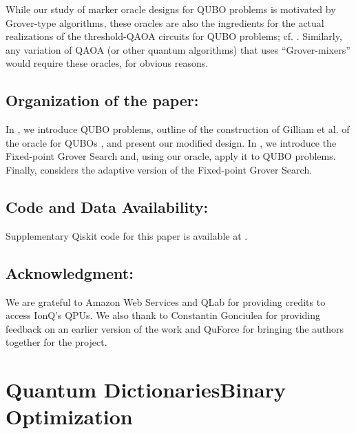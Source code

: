 \documentclass[reqno, 10pt]{amsart}
\numberwithin{equation}{section}                     %
\begin{document}
\smallskip

While our study of marker oracle designs for QUBO problems is motivated by Grover-type algorithms, these oracles are also the ingredients for the actual realizations of the threshold-QAOA circuits for QUBO problems; cf. \cite{golden_threshold_2021}. Similarly, any variation of QAOA (or other quantum algorithms) that uses ``Grover-mixers'' would require these oracles, for obvious reasons.

\medskip

\subsection*{Organization of the paper:} In , we introduce QUBO problems, outline of the construction of Gilliam et al. of the oracle for QUBOs \cite{gilliam_grover_2021}, and present our modified design. In , we introduce the Fixed-point Grover Search and, using our oracle, apply it to QUBO problems. Finally,  considers the adaptive version of the Fixed-point Grover Search.

\smallskip

\subsection*{Code and Data Availability:} Supplementary Qiskit code for this paper is available at \cite{github_fpgs_for_qubo}.

\smallskip

\subsection*{Acknowledgment:} We are grateful to Amazon Web Services and QLab for providing credits to access IonQ's QPUs. We also thank to Constantin Gonciulea for providing feedback on an earlier version of the work and QuForce for bringing the authors together for the project.

\bigskip

\section{Quantum DictionariesBinary Optimization}
\label{sec:qdicts_and_qubos}
\end{document}
